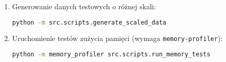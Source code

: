 \documentclass[12pt,a4paper]{article}
\begin{document}
\begin{enumerate}[label*=\arabic*.]
    \item Generowanie danych testowych o różnej skali:
    \begin{lstlisting}[language=bash]
python -m src.scripts.generate_scaled_data
    \end{lstlisting}
    \item Uruchomienie testów zużycia pamięci (wymaga \texttt{memory-profiler}):
    \begin{lstlisting}[language=bash]
python -m memory_profiler src.scripts.run_memory_tests
    \end{lstlisting}
\end{enumerate}


\printbibliography[heading=bibintoc]
\end{document}

